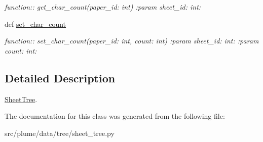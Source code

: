 \begin{DoxyCompactItemize}
\begin{DoxyCompactList}\small\item\em function\+:\+: get\+\_\+char\+\_\+count(paper\+\_\+id\+: int) \+:param sheet\+\_\+id\+: int\+: \end{DoxyCompactList}\item 
def \hyperlink{classplume-creator_1_1src_1_1plume_1_1data_1_1tree_1_1sheet__tree_1_1_sheet_tree_a0502271b0e2accb48661542c0c883d78}{set\+\_\+char\+\_\+count}\hypertarget{classplume-creator_1_1src_1_1plume_1_1data_1_1tree_1_1sheet__tree_1_1_sheet_tree_a0502271b0e2accb48661542c0c883d78}{}\label{classplume-creator_1_1src_1_1plume_1_1data_1_1tree_1_1sheet__tree_1_1_sheet_tree_a0502271b0e2accb48661542c0c883d78}

\begin{DoxyCompactList}\small\item\em function\+:\+: set\+\_\+char\+\_\+count(paper\+\_\+id\+: int, count\+: int) \+:param sheet\+\_\+id\+: int\+: \+:param count\+: int\+: \end{DoxyCompactList}\end{DoxyCompactItemize}


\subsection{Detailed Description}
\hyperlink{classplume-creator_1_1src_1_1plume_1_1data_1_1tree_1_1sheet__tree_1_1_sheet_tree}{Sheet\+Tree}. 

The documentation for this class was generated from the following file\+:\begin{DoxyCompactItemize}
\item 
src/plume/data/tree/sheet\+\_\+tree.\+py\end{DoxyCompactItemize}
